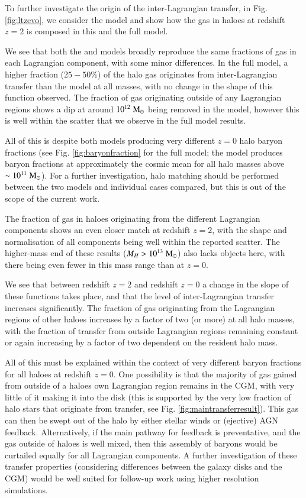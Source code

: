 To further investigate the origin of the inter-Lagrangian transfer, in Fig.
\ref{fig:ltzevo}, we consider the \nojet{} model and show how the gas in
haloes at redshift $z=2$ is composed in this and the full \simba{} model.

We see that both the \nojet{} and \simba{} models broadly reproduce the same
fractions of gas in each Lagrangian component, with some minor differences.
In the full model, a higher fraction ($25-50\%$) of the halo gas originates
from inter-Lagrangian transfer than the \nojet{} model at all masses, with no
change in the shape of this function observed. The fraction of gas
originating outside of any Lagrangian regions shows a dip at around
$10^{12}\;{\rm M}_{\odot}{}$ being removed in the \nojet{} model, however this is well
within the scatter that we observe in the full model results.

All of this is despite both models producing very different $z=0$ halo baryon
fractions (see Fig. \ref{fig:baryonfraction} for the full model; the \nojet{}
model produces baryon fractions at approximately the cosmic mean for all halo
masses above $\sim10^{11}\;{\rm M}_{\odot}{}$). For a further investigation, halo matching
should be performed between the two models and individual cases compared, but
this is out of the scope of the current work.

The fraction of gas in haloes originating from the different Lagrangian
components shows an even closer match at redshift $z=2$, with the shape and
normalisation of all components being well within the reported scatter. The
higher-mass end of these results ($M_H > 10^{13}\;{\rm M}_{\odot}{}$) also lacks
objects here, with there being even fewer in this mass range than at $z=0$.

We see that between redshift $z=2$ and redshift $z=0$ a change in the slope
of these functions takes place, and that the level of inter-Lagrangian transfer
increases significantly. The fraction of gas originating from the Lagrangian 
regions of other haloes increases by a factor of two (or more) at all halo
masses, with the fraction of transfer from outside Lagrangian regions remaining
constant or again increasing by a factor of two dependent on the resident halo mass.

All of this must be explained within the context of very different baryon
fractions for all haloes at redshift $z=0$. One possibility is that the
majority of gas gained from outside of a haloes own Lagrangian region remains
in the CGM, with very little of it making it into the disk (this is supported
by the very low fraction of halo stars that originate from transfer, see Fig.
\ref{fig:maintransferresult}). This gas can then be swept out of the halo by
either stellar winds or (ejective) AGN feedback. Alternatively, if
the main pathway for feedback is preventative, and the gas outside of haloes
is well mixed, then this assembly of baryons would be curtailed equally for
all Lagrangian components. A further investigation of these transfer
properties (considering differences between the galaxy disks and the CGM)
would be well suited for follow-up work using higher resolution simulations.

